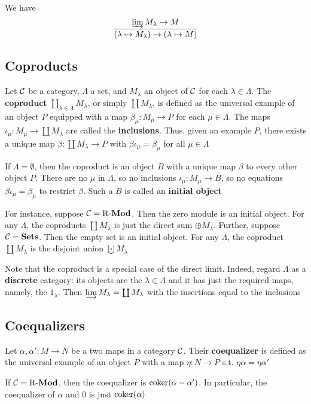 \documentclass[11pt]{article}
\begin{document}
We have
\begin{equation*}
\frac{\varinjlim M_\lambda\to M}{(\lambda\mapsto M_\lambda)\to(\lambda\mapsto M)}
\end{equation*}
\subsection*{Coproducts}
\label{sec:org814f99a}
Let \(\mathcal{C}\) be a category, \(\Lambda\) a set, and \(M_\lambda\) an object of
\(\mathcal{C}\) for each \(\lambda\in\Lambda\). The \textbf{coproduct}
\(\coprod_{\lambda\in\Lambda}M_\lambda\), or simply \(\coprod M_\lambda\), is
defined as the universal example of an object \(P\) equipped with a map
\(\beta_\mu:M_\mu\to P\) for each \(\mu\in\Lambda\). The maps
\(\iota_\mu:M_\mu\to\coprod M_\lambda\) are called the \textbf{inclusions}. Thus,
given an example \(P\), there exists a unique map \(\beta:\coprod M_\lambda\to
   P\) with \(\beta\iota_\mu=\beta_\mu\) for all \(\mu\in\Lambda\)

If \(\Lambda=\emptyset\), then the coproduct is an object \(B\) with a unique
map \(\beta\) to every other object \(P\). There are no \(\mu\) in \(\Lambda\), so no inclusions
\(\iota_\mu:M_\mu\to B\), so no equations \(\beta\iota_\mu=\beta_\mu\) to
restrict \(\beta\). Such a \(B\) is called an \textbf{initial object}

For instance, suppose \(\mathcal{C}=\operatorname{R-\textbf{Mod}}\). Then the zero module is an initial
object. For any \(\Lambda\), the coproducts \(\coprod M_\lambda\) is just the direct
sum \(\oplus M_\lambda\). Further, suppose \(\mathcal{C}=\operatorname{\textbf{Sets}}\). Then the empty
set is an initial object. For any \(\Lambda\), the coproduct \(\coprod M_\lambda\) is
the disjoint union \(\bigcupdot M_\lambda\)

Note that the coproduct is a special case of the direct limit. Indeed, regard
\(\Lambda\) as a \textbf{discrete} category: its objects are the \(\lambda\in\Lambda\) and it
has just the required maps, namely, the \(1_\lambda\). Then \(\varinjlim
   M_\lambda=\coprod M_\lambda\) with the insertions equal to the inclusions
\subsection*{Coequalizers \label{6.8}}
\label{sec:org0462a05}
Let \(\alpha,\alpha':M\to N\) be a two maps in a category \(\mathcal{C}\). Their
\textbf{coequalizer} is defined as the universal example of an object \(P\) with a map
\(\eta:N\to P\) s.t. \(\eta\alpha=\eta\alpha'\)
\begin{center}
\end{center}
If \(\mathcal{C}=\operatorname{R-\textbf{Mod}}\), then the coequalizer is \(\operatorname{coker}(\alpha-\alpha')\). In
particular, the coequalizer of \(\alpha\) and 0 is just \(\operatorname{coker}(\alpha)\)
\end{document}
